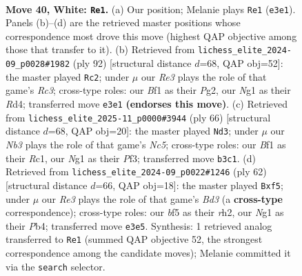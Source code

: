 \documentclass[11pt]{article}
\begin{document}
\clearpage

\begin{figure}[p]\centering
\begin{subfigure}{0.46\textwidth}\centering
\resizebox{\linewidth}{!}{%
\newchessgame
\chessboard[
  setfen={5r2/4r1k1/1p6/p1p1nb2/P5p1/1NP1R1P1/K6P/5BNR w - - 1 40},
  showmover=false,
  pgfstyle=straightmove, color=movearrow, markmove={e3-e1}
]}
\caption{}
\end{subfigure}\hfill
\begin{subfigure}{0.46\textwidth}\centering
\resizebox{\linewidth}{!}{%
\newchessgame
\chessboard[
  setfen={2r5/p3r3/bp4pk/2nB3p/3RP2P/P1R1K1N1/6P1/8 w - - 31 47},
  showmover=false,
  pgfstyle=straightmove, color=movearrow, markmove={c3-c2}
]}
\caption{}
\end{subfigure}
\\[4pt]
\begin{subfigure}{0.46\textwidth}\centering
\resizebox{\linewidth}{!}{%
\newchessgame
\chessboard[
  setfen={br1r2n1/5pk1/4p3/p1NpP1p1/B7/5P2/PP1R1KP1/2R5 w - - 0 34},
  showmover=false,
  pgfstyle=straightmove, color=movearrow, markmove={c5-d3}
]}
\caption{}
\end{subfigure}\hfill
\begin{subfigure}{0.46\textwidth}\centering
\resizebox{\linewidth}{!}{%
\newchessgame
\chessboard[
  setfen={2r1k3/R4pp1/2b1p3/1p2Pn2/1P1R1P2/2NB4/1KP4r/8 w - - 4 32},
  showmover=false,
  pgfstyle=straightmove, color=movearrow, markmove={d3-f5}
]}
\caption{}
\end{subfigure}
\caption{\textbf{Move 40, White: \texttt{Re1}.} (a) Our position; Melanie plays \texttt{Re1} (\texttt{e3e1}). Panels (b)--(d) are the retrieved master positions whose correspondence most drove this move (highest QAP objective among those that transfer to it). (b) Retrieved from \texttt{lichess\_elite\_2024-09\_p0028\#1982} (ply 92) [structural distance $d$=68, QAP obj=52]: the master played \texttt{Rc2}; under $\mu$ our \emph{Re3} plays the role of that game's \emph{Rc3}; cross-type roles: our \emph{B}f1 as their \emph{P}g2, our \emph{N}g1 as their \emph{R}d4; transferred move \texttt{e3e1} \textbf{(endorses this move)}. (c) Retrieved from \texttt{lichess\_elite\_2025-11\_p0000\#3944} (ply 66) [structural distance $d$=68, QAP obj=20]: the master played \texttt{Nd3}; under $\mu$ our \emph{Nb3} plays the role of that game's \emph{Nc5}; cross-type roles: our \emph{B}f1 as their \emph{R}c1, our \emph{N}g1 as their \emph{P}f3; transferred move \texttt{b3c1}. (d) Retrieved from \texttt{lichess\_elite\_2024-09\_p0022\#1246} (ply 62) [structural distance $d$=66, QAP obj=18]: the master played \texttt{Bxf5}; under $\mu$ our \emph{Re3} plays the role of that game's \emph{Bd3} (a \textbf{cross-type} correspondence); cross-type roles: our \emph{b}f5 as their \emph{r}h2, our \emph{N}g1 as their \emph{P}b4; transferred move \texttt{e3e5}. Synthesis: 1 retrieved analog transferred to \texttt{Re1} (summed QAP objective 52, the strongest correspondence among the candidate moves); Melanie committed it via the \texttt{search} selector.}
\label{fig:thought-m78}
\end{figure}
\end{document}
